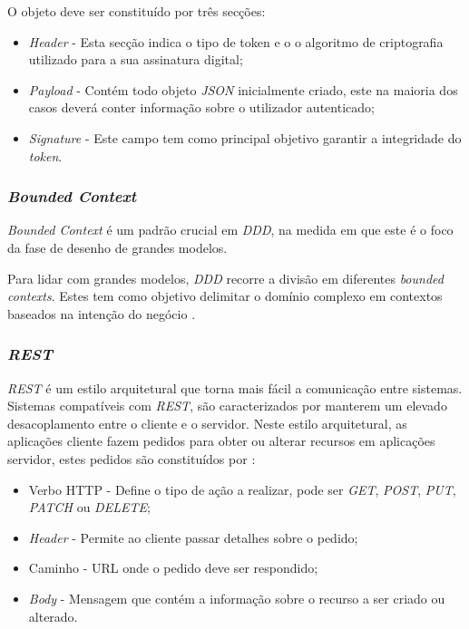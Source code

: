 O objeto deve ser constituído por três secções:
\begin{itemize}
    \item \emph{Header} - Esta secção indica o tipo de token e o o algoritmo de criptografia utilizado para a sua assinatura digital;
    \item \emph{Payload} - Contém todo objeto \emph{JSON} inicialmente criado, este na maioria dos casos deverá conter informação sobre o utilizador autenticado;
    \item \emph{Signature} - Este campo tem como principal objetivo garantir a integridade do \emph{token}.
\end{itemize}

\subsubsection{\emph{Bounded Context}} \label{subsubsection:bounded:context}
\emph{Bounded Context} é um padrão crucial em \emph{\acrfull{DDD}}, na medida em que este é o foco da fase de desenho de grandes modelos.

Para lidar com grandes modelos, \emph{\acrshort{DDD}} recorre a divisão em diferentes \emph{bounded contexts}. Estes tem como objetivo delimitar o domínio complexo em contextos baseados na intenção do negócio \cite{bounded_context}.

\subsubsection{\emph{\acrshort{REST}}}
\emph{\acrshort{REST}} é um estilo arquitetural que torna mais fácil a comunicação entre sistemas. Sistemas compatíveis com \emph{\acrshort{REST}}, são caracterizados por manterem um elevado desacoplamento entre o cliente e o servidor.
Neste estilo arquitetural, as aplicações cliente fazem pedidos para obter ou alterar recursos em aplicações servidor, estes pedidos são constituídos por \cite{rest}:
\begin{itemize}
    \item Verbo HTTP - Define o tipo de ação a realizar, pode ser \emph{GET}, \emph{POST}, \emph{PUT}, \emph{PATCH} ou \emph{DELETE};
    \item \emph{Header} - Permite ao cliente passar detalhes sobre o pedido;
    \item Caminho - URL onde o pedido deve ser respondido;
    \item \emph{Body} - Mensagem que contém a informação sobre o recurso a ser criado ou alterado.
\end{itemize}

